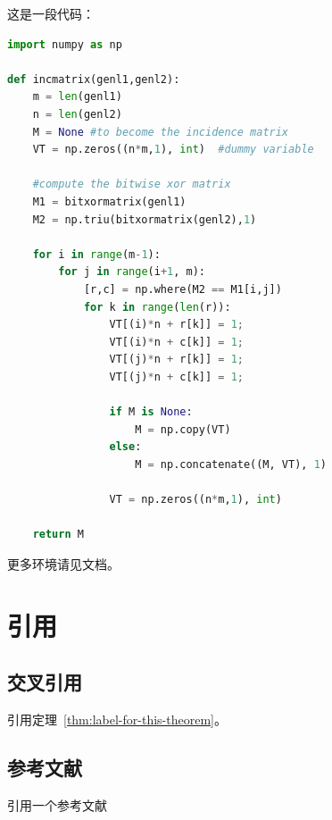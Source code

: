 这是一段代码：

\begin{lstlisting}[language=Python, caption=Python example]
import numpy as np

def incmatrix(genl1,genl2):
    m = len(genl1)
    n = len(genl2)
    M = None #to become the incidence matrix
    VT = np.zeros((n*m,1), int)  #dummy variable

    #compute the bitwise xor matrix
    M1 = bitxormatrix(genl1)
    M2 = np.triu(bitxormatrix(genl2),1)

    for i in range(m-1):
        for j in range(i+1, m):
            [r,c] = np.where(M2 == M1[i,j])
            for k in range(len(r)):
                VT[(i)*n + r[k]] = 1;
                VT[(i)*n + c[k]] = 1;
                VT[(j)*n + r[k]] = 1;
                VT[(j)*n + c[k]] = 1;

                if M is None:
                    M = np.copy(VT)
                else:
                    M = np.concatenate((M, VT), 1)

                VT = np.zeros((n*m,1), int)

    return M
\end{lstlisting}

更多环境请见文档。

\section{引用}

\subsection{交叉引用}

引用定理~\ref{thm:label-for-this-theorem}。

\subsection{参考文献}

引用一个参考文献~\cite{cormen2009introduction}
